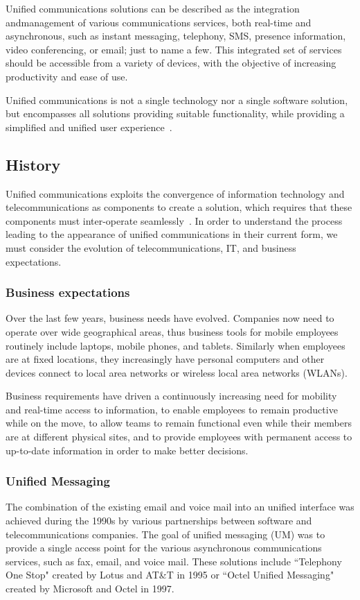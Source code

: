 Unified communications solutions can be described as the integration and\linebreak[4]management of various communications services, both real-time and asynchronous, such as instant messaging, telephony, SMS, presence information, video conferencing, or email; just to name a few. This integrated set of services should be accessible from a variety of devices, with the objective of increasing productivity and ease of use.

Unified communications is not a single technology nor a single software solution, but encompasses all solutions providing suitable functionality, while providing a simplified and unified user experience~\cite{fikry_unified_2012, riemer_unified_2009, pleasant_what_2008}.


\subsection{History}
Unified communications exploits the convergence of information technology and telecommunications as components to create a solution, which requires that these components must inter-operate seamlessly~\cite{riemer_unified_2009}. In order to understand the process leading to the appearance of unified communications in their current form, we must consider the evolution of telecommunications, IT, and business expectations.


\subsubsection{Business expectations}
Over the last few years, business needs have evolved. Companies now need to operate over wide geographical areas, thus business tools for mobile employees routinely include laptops, mobile phones, and tablets. Similarly when employees are at fixed locations, they increasingly have personal computers and other devices connect to local area networks or wireless local area networks (WLANs).

Business requirements have driven a continuously increasing need for mobility and real-time access to information, to enable employees to remain productive while on the move, to allow teams to remain functional even while their members are at different physical sites, and to provide employees with permanent access to up-to-date information in order to make better decisions\cite{mcknight_mobile_2011}.


\subsubsection{Unified Messaging}
The combination of the existing email and voice mail into an unified interface was achieved during the 1990s by various partnerships between software and telecommunications companies. The goal of unified messaging (UM) was to provide a single access point for the various asynchronous communications services, such as fax, email, and voice mail\cite{pleasant_what_2008}. These solutions include ``Telephony One Stop" created by Lotus and AT\&T in 1995 or ``Octel Unified Messaging" created by Microsoft and Octel in 1997\cite{parker_short_2009}.

